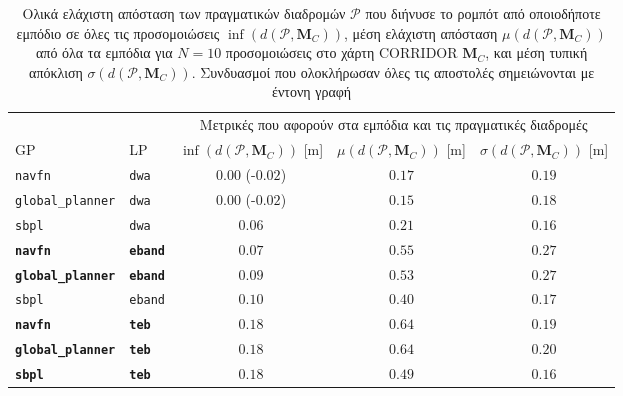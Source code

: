 \begin{table}[h]
\renewcommand{\arraystretch}{1.3}
\begin{tabular}{llccc}
  & & \multicolumn{3}{c}{Μετρικές που αφορούν στα εμπόδια και τις πραγματικές διαδρομές} \\
  \cline{3-5}
  GP & LP & $\inf(d(\bm{\mathcal{P}},\bm{M}_C))$ [m] & $\mu(d(\bm{\mathcal{P}},\bm{M}_C))$ [m] & $\sigma(d(\bm{\mathcal{P}},\bm{M}_C))$ [m] \\ \toprule
  \texttt{navfn} & \texttt{dwa} & \hspace{0.82cm} $0.00$ (-$0.02$) & $0.17$ & $0.19$ \\
  \texttt{global\_planner} & \texttt{dwa} & \hspace{0.82cm} $0.00$ (-$0.02$) & $0.15$ & $0.18$ \\
  \texttt{sbpl} & \texttt{dwa} & $0.06$ & $0.21$ & $0.16$ \\
  \textbf{\texttt{navfn}} & \textbf{\texttt{eband}} & $\bm{0.07}$ & $\bm{0.55}$ & $\bm{0.27}$ \\
  \textbf{\texttt{global\_planner}} & \textbf{\texttt{eband}} & $\bm{0.09}$ & $\bm{0.53}$ & $\bm{0.27}$ \\
  \texttt{sbpl} & \texttt{eband} & $0.10$ & $0.40$ & $0.17$ \\
  \textbf{\texttt{navfn}} & \textbf{\texttt{teb}} & $\bm{0.18}$ & $\bm{0.64}$ & $\bm{0.19}$ \\
  \textbf{\texttt{global\_planner}} & \textbf{\texttt{teb}} & $\bm{0.18}$ & $\bm{0.64}$ & $\bm{0.20}$ \\
  \textbf{\texttt{sbpl}} & \textbf{\texttt{teb}} & $\bm{0.18}$ & $\bm{0.49}$ & $\bm{0.16}$ \\ \bottomrule
\end{tabular}
\caption{\small Ολικά ελάχιστη απόσταση των πραγματικών διαδρομών
         $\bm{\mathcal{P}}$ που διήνυσε το ρομπότ από οποιοδήποτε εμπόδιο σε
         όλες τις προσομοιώσεις $\inf(d(\bm{\mathcal{P}},\bm{M}_C))$, μέση
         ελάχιστη απόσταση $\mu(d(\bm{\mathcal{P}},\bm{M}_C))$ από όλα τα
         εμπόδια για $N=10$ προσομοιώσεις στο χάρτη CORRIDOR $\bm{M}_C$, και μέση τυπική απόκλιση
         $\sigma(d(\bm{\mathcal{P}},\bm{M}_C))$. Συνδυασμοί που
         ολοκλήρωσαν όλες τις αποστολές σημειώνονται με έντονη γραφή}
\label{tbl:info_ground_truth_map_corridor}
\end{table}

